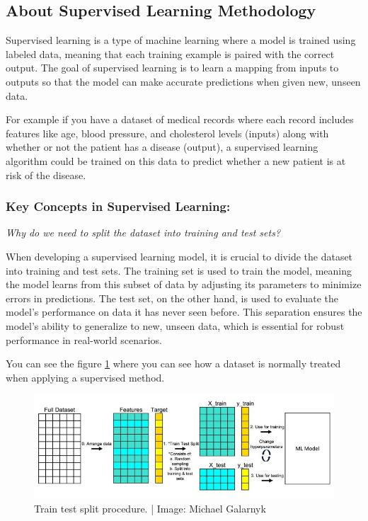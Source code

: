 \documentclass{llncs}
\begin{document}
\subsection{About Supervised Learning Methodology}

Supervised learning is a type of machine learning where a model is trained using labeled data, meaning that each training example is paired with the correct output. The goal of supervised learning is to learn a mapping from inputs to outputs so that the model can make accurate predictions when given new, unseen data.\cite{Hastie2009}


For example if you have a dataset of medical records where each record includes features like age, blood pressure, and cholesterol levels (inputs) along with whether or not the patient has a disease (output), a supervised learning algorithm could be trained on this data to predict whether a new patient is at risk of the disease.

\subsubsection{Key Concepts in Supervised Learning:}

\textit{Why do we need to split the dataset into training and test sets?}

When developing a supervised learning model, it is crucial to divide the dataset into training and test sets. The training set is used to train the model, meaning the model learns from this subset of data by adjusting its parameters to minimize errors in predictions. The test set, on the other hand, is used to evaluate the model's performance on data it has never seen before. This separation ensures the model's ability to generalize to new, unseen data, which is essential for robust performance in real-world scenarios.

You can see the figure \ref{fig:dataset} where you can see how a dataset is normally treated when applying a supervised method.

\vspace{-20pt} %

\begin{figure}[h!]
	\begin{center}  %
		\includegraphics[width=1\textwidth]{images/dataset.jpg}
		\caption{Train test split procedure. | Image: Michael Galarnyk\cite{train}}
		\label{fig:dataset}
	\end{center}
\end{figure}
\end{document}
